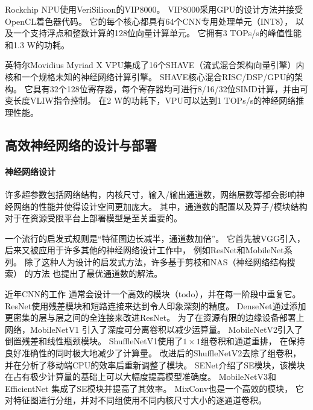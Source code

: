 Rockchip NPU\cite{rk3399pro}使用VeriSilicon的VIP8000。
VIP8000采用GPU的设计方法并接受OpenCL着色器代码。
它的每个核心都具有64个CNN专用处理单元（INT8），
以及一个支持浮点和整数计算的128位向量计算单元。
它拥有3 TOPs/s的峰值性能和1.3 W的功耗。

英特尔Movidius Myriad X VPU集成了16个SHAVE（流式混合架构向量引擎）内核和一个规格未知的神经网络计算引擎。
SHAVE核心\cite{shave}混合RISC/DSP/GPU的架构。
它具有32个128位寄存器，每个寄存器均可进行8/16/32位SIMD计算，并由可变长度VLIW指令控制。
在2 W的功耗下，VPU可以达到1 TOPs/s的神经网络推理性能。

\subsection{高效神经网络的设计与部署}

\paragraph{神经网络设计}
许多超参数包括网络结构，内核尺寸，输入/输出通道数，网络层数等都会影响神经网络的性能并使得设计空间更加庞大。
其中，通道数的配置以及算子/模块结构对于在资源受限平台上部署模型是至关重要的。

一个流行的启发式规则是``特征图边长减半，通道数加倍''。
它首先被VGG\cite{simonyan2014very}引入，
后来又被应用于许多其他的神经网络设计工作中，
例如ResNet\cite{he2016deep}和MobileNet\cite{howard2017mobilenets, sandler2018mobilenetv2}系列。
除了这种人为设计的启发式方法，许多基于剪枝和NAS（神经网络结构搜索）
\cite{he2018amc, lee2019device, liu2019metapruning}的方法
也提出了最优通道数的解法。

近年CNN的工作\cite{he2016deep, ma2018shufflenet, sandler2018mobilenetv2}
通常会设计一个高效的模块（todo），并在每一阶段中重复它。
ResNet\cite{he2016deep}使用残差模块和短路连接来达到令人印象深刻的精度。
DenseNet\cite{huang2017densely}通过添加更密集的层与层之间的全连接来改进ResNet。
为了在资源有限的边缘设备部署上网络，MobileNetV1\cite{howard2017mobilenets}
引入了深度可分离卷积以减少运算量。
MobileNetV2\cite{sandler2018mobilenetv2}引入了倒置残差和线性瓶颈模块。
ShuffleNetV1\cite{zhang2018shufflenet}使用了$1\times 1$组卷积和通道重排，
在保持良好准确性的同时极大地减少了计算量。
改进后的ShuffleNetV2\cite{ma2018shufflenet}去除了组卷积，
并在分析了移动端CPU的效率后重新调整了模块。
SENet\cite{hu2018squeeze}介绍了SE模块，该模块在占有极少计算量的基础上可以大幅度提高模型准确度。
MobileNetV3\cite{howard2019searching}和EfficientNet\cite{tan2019efficientnet}
集成了SE模块并提高了其效率。
MixConv\cite{tan2019mixconv}也是一个高效的模块，
它对特征图进行分组，并对不同组使用不同内核尺寸大小的逐通道卷积。

